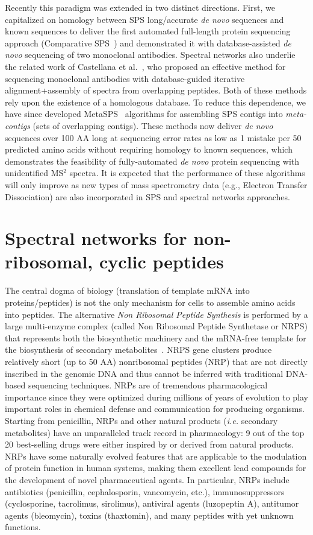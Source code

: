 \documentclass[8.5pt,twoside,twocolumn]{article}
\begin{document}
Recently this paradigm was extended in two distinct directions. First, we capitalized on homology between SPS long/accurate {\em de novo} sequences and known sequences to deliver the first automated full-length protein sequencing approach (Comparative SPS~\cite{bandeira08}) and demonstrated it with database-assisted {\em de novo} sequencing of two monoclonal antibodies. Spectral networks also underlie the related work of Castellana et al.~\cite{castellana10,castellana11}, who proposed an effective method for sequencing monoclonal antibodies with database-guided iterative alignment+assembly of spectra from overlapping peptides. Both of these methods rely upon the existence of a homologous database. To reduce this dependence, we have since developed MetaSPS~\cite{guthals12} algorithms for assembling SPS contigs into {\em meta-contigs} (sets of overlapping contigs). These methods now deliver {\em de novo} sequences over 100 AA long at sequencing error rates as low as 1 mistake per 50 predicted amino acids without requiring homology to known sequences, which demonstrates the feasibility of fully-automated {\em de novo} protein sequencing with unidentified MS$^2$ spectra. It is expected that the performance of these algorithms will only improve as new types of mass spectrometry data (e.g., Electron Transfer Dissociation) are also incorporated in SPS and spectral networks approaches.

\section{Spectral networks for non-ribosomal, cyclic peptides}

The central dogma of biology (translation of template mRNA into proteins/peptides) is not the only mechanism for cells to assemble amino acids into peptides. The alternative {\em Non Ribosomal Peptide Synthesis} is performed by a large multi-enzyme complex (called Non Ribosomal Peptide Synthetase or NRPS) that represents both the biosynthetic machinery and the mRNA-free template for the biosynthesis of secondary metabolites~\cite{sieber05,dorrestein06,welker06}. NRPS gene clusters produce relatively short (up to 50 AA) nonribosomal peptides (NRP) that are not directly inscribed in the genomic DNA and thus cannot be inferred with traditional DNA-based sequencing techniques. NRPs are of tremendous pharmacological importance since they were optimized during millions of years of evolution to play important roles in chemical defense and communication for producing organisms. Starting from penicillin, NRPs and other natural products ({\em i.e.} secondary metabolites) have an unparalleled track record in pharmacology: 9 out of the top 20 best-selling drugs were either inspired by or derived from natural products. NRPs have some naturally evolved features that are applicable to the modulation of protein function in human systems, making them excellent lead compounds for the development of novel pharmaceutical agents. In particular, NRPs include antibiotics (penicillin, cephalosporin, vancomycin, etc.), immunosuppressors (cyclosporine, tacrolimus, sirolimus), antiviral agents (luzopeptin A), antitumor agents (bleomycin), toxins (thaxtomin), and many peptides with yet unknown functions.
\end{document}
